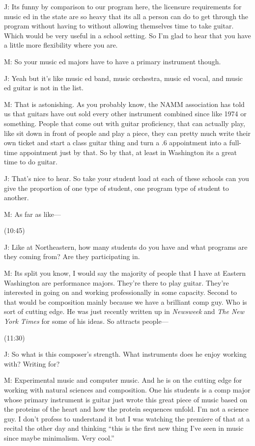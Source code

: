 \documentclass[11pt]{article}
\begin{document}
J: Its funny by comparison to our program here, the licensure requirements for music ed in the state are so heavy that its all a person can do to get through the program without having to without allowing themselves time to take guitar. Which would be very useful in a school setting. So I'm glad to hear that you have a little more flexibility where you are. 

M: So your music ed majors have to have a primary instrument though.

J: Yeah but it's like music ed band, music orchestra, music ed vocal, and music ed guitar is not in the list. 

M: That is astonishing. As you probably know, the NAMM association has told us that guitars have out sold every other instrument combined since like 1974 or something. People that come out with guitar proficiency, that can actually play, like sit down in front of people and play a piece, they can pretty much write their own ticket and start a class guitar thing and turn a .6 appointment into a full-time appointment just by that. So by that, at least in Washington its a great time to do guitar. 

J: That's nice to hear. So take your student load at each of these schools can you give the proportion of one type of student, one program type of student to another. 

M: As far as like—

(10:45)

J: Like at Northeastern, how many students do you have and what programs are they coming from? Are they participating in.

M: Its split you know, I would say the majority of people that I have at Eastern Washington are performance majors. They're there to play guitar. They're interested in going on and working professionally in some capacity. Second to that would be composition mainly because we have a brilliant comp guy. Who is sort of cutting edge. He was just recently written up in \emph{Newsweek} and \emph{The New York Times} for some of his ideas. So attracts people—

(11:30)

J: So what is this composer's strength. What instruments does he enjoy working with? Writing for?

M: Experimental music and computer music. And he is on the cutting edge for working with natural sciences and composition. One his students is a comp major whose primary instrument is guitar just wrote this great piece of music based on the proteins of the heart and how the protein sequences unfold. I'm not a science guy. I don't profess to understand it but I was watching the premiere of that at a recital the other day and thinking ``this is the first new thing I've seen in music since maybe minimalism. Very cool.'' 
\end{document}
